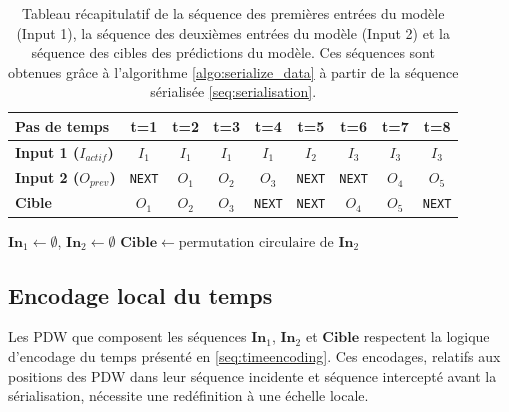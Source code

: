 \begin{table}[htbp]
\centering
\begin{tabular}{l|c|c|c|c|c|c|c|c}
\toprule
\textbf{Pas de temps} & \textbf{t=1} & \textbf{t=2} & \textbf{t=3} & \textbf{t=4} & \textbf{t=5} & \textbf{t=6} & \textbf{t=7} & \textbf{t=8}\\
\midrule
\textbf{Input 1 ($I_{actif}$)} & $I_1$ & $I_1$ & $I_1$ & $I_1$ & $I_2$ &$I_3$ & $I_3$&$I_3$\\
\textbf{Input 2 ($O_{prev}$)} & \texttt{NEXT}& $O_1$ & $O_2$ & $O_3$ & \texttt{NEXT} & \texttt{NEXT}& $O_4$  & $O_5$\\
\textbf{Cible} & $O_1$ & $O_2$ & $O_3$ & \texttt{NEXT} & \texttt{NEXT}& $O_4$  & $O_5$ & \texttt{NEXT}\\
\bottomrule
\end{tabular}
\caption{Tableau récapitulatif de la séquence des premières entrées du modèle (Input 1), la séquence des deuxièmes entrées du modèle (Input 2) et la séquence des cibles des prédictions du modèle. Ces séquences sont obtenues grâce à l'algorithme \ref{algo:serialize_data} à partir de la séquence sérialisée \ref{seq:serialisation}.}
\label{tab:seqfusion}
\end{table}


\begin{algorithm}[htbp]
\DontPrintSemicolon
\SetAlgoLined
{}
$\mathbf{In}_1 \leftarrow \emptyset$, $\mathbf{In}_2 \leftarrow \emptyset$\;
$\mathbf{Cible} \leftarrow \text{permutation circulaire de } \mathbf{In}_2$ 
\caption{Création des triplets d'entraînement par sérialisation événementielle}
\label{algo:serialize_data}
\end{algorithm}

\subsection{Encodage local du temps}
Les PDW que composent les séquences $\mathbf{In}_1$, $\mathbf{In}_2$ et $\mathbf{Cible}$ respectent la logique d'encodage du temps présenté en \ref{seq:timeencoding}. Ces encodages, relatifs aux positions des PDW dans leur séquence incidente et séquence intercepté avant la sérialisation, nécessite une redéfinition à une échelle locale.

